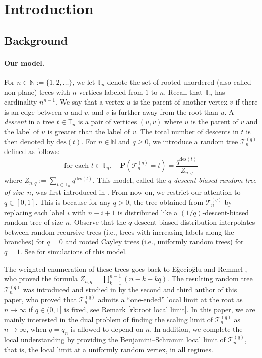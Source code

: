 \documentclass{article}
\theoremstyle{remark}
\newcommand{\bN}{\mathbb{N}}
\newcommand{\bT}{\mathbb{T}}
\newcommand{\cT}{\mathcal{T}}
\newcommand{\prob}[1]{\mathbf{P}{\left(#1\right)}}
\newcommand{\des}[1]{{\mathrm{des}{\left(#1\right)}}}
\begin{document}
\newpage

\tableofcontents

\newpage

\section{Introduction}

\subsection{Background}

\paragraph{Our model.}
For $n\in\bN := \{1,2,\ldots \}$, we let $\bT_n$ denote the set of rooted unordered (also called non-plane) trees with $n$ vertices labeled from $1$ to $n$.
Recall that $\bT_n$ has cardinality $n^{n-1}$.
We say that a vertex $u$ is the parent of another vertex $v$ if there is an edge between $u$ and $v$, and $v$ is further away from the root than $u$.
A \emph{descent} in a tree $t\in\bT_n$ is a pair of vertices $(u,v)$ where $u$ is the parent of $v$ and the label of $u$ is greater than the label of $v$.
The total number of descents in $t$ is then denoted by $\des{t}$.
For $n\in\bN$ and $q\ge0$, we introduce a random tree $\cT_n^{(q)}$ defined as follows:
\begin{equation*}
    \text{for each } t\in\bT_n,\quad
    \prob{ \cT_n^{(q)} = t } = \frac{q^\des{t}}{Z_{n,q}}
\end{equation*}
where $Z_{n,q} := \sum_{t\in\bT_n} q^\des{t}$.
This model, called the \emph{$q$-descent-biased random tree of size~$n$}, was first introduced in \cite{Thevenin_Wagner_2023}.
From now on, we restrict our attention to $q\in[0,1]$.
This is because for any $q>0$, the tree obtained from $\cT_n^{(q)}$ by replacing each label $i$ with $n-i+1$ is distributed like a $(1/q)$-descent-biased random tree of size $n$.
Observe that the $q$-descent-biased distribution interpolates between random recursive trees (i.e., trees with increasing labels along the branches) for $q=0$ and rooted Cayley trees (i.e., uniformly random trees) for $q=1$.
See  for simulations of this model.

The weighted enumeration of these trees goes back to E\u{g}ecio\u{g}lu and Remmel \cite{ER86}, who proved the formula $Z_{n,q} = \prod_{k=1}^{n-1} (n-k+kq)$. 
The resulting random tree $\cT_n^{(q)}$ was introduced and studied in \cite{Thevenin_Wagner_2023} by the second and third author of this paper, who proved that $\cT_n^{(q)}$ admits a \enquote{one-ended} local limit at the root as $n\to\infty$ if $q\in(0,1]$ is fixed, see Remark \ref{rk:root local limit}.
In this paper, we are mainly interested in the dual problem of finding the scaling limit of $\cT_n^{(q)}$ as $n\to\infty$, when $q=q_n$ is allowed to depend on $n$.
In addition, we complete the local understanding by providing the Benjamini--Schramm local limit of $\cT_n^{(q)}$, that is, the local limit at a uniformly random vertex, in all regimes.
\end{document}
